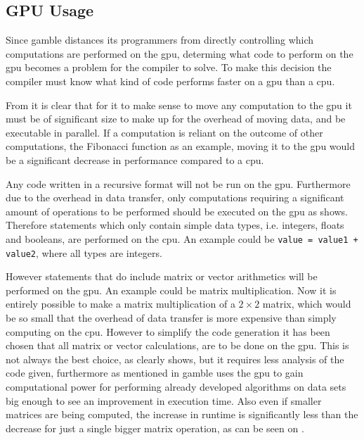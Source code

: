 \subsection*{GPU Usage}\label{GPUCode}
Since \gls{gamble} distances its programmers from directly controlling which computations are performed on the \acrshort{gpu}, determing what code to perform on the \acrshort{gpu} becomes a problem for the compiler to solve.
To make this decision the compiler must know what kind of code performs faster on a \acrshort{gpu} than a \acrshort{cpu}.

From  it is clear that for it to make sense to move any computation to the \acrshort{gpu} it must be of significant size to make up for the overhead of moving data, and be executable in parallel.
If a computation is reliant on the outcome of other computations, the Fibonacci function as an example, moving it to the \acrshort{gpu} would be a significant decrease in performance compared to a \acrshort{cpu}.

Any code written in a recursive format will not be run on the \acrshort{gpu}. 
Furthermore due to the overhead in data transfer, only computations requiring a significant amount of operations to be performed should be executed on the \acrshort{gpu} as  shows.
Therefore statements which only contain simple data types, i.e. integers, floats and booleans, are performed on the \acrshort{cpu}.
An example could be \texttt{value = value1 + value2}, where all types are integers.

However statements that do include matrix or vector arithmetics will be performed on the \acrshort{gpu}.
An example could be matrix multiplication.
Now it is entirely possible to make a matrix multiplication of a $2\times2$ matrix, which would be so small that the overhead of data transfer is more expensive than simply computing on the \acrshort{cpu}.
However to simplify the code generation it has been chosen that all matrix or vector calculations, are to be done on the \acrshort{gpu}.
This is not always the best choice, as  clearly shows, but it requires less analysis of the code given, furthermore as mentioned in  \gls{gamble} uses the \acrshort{gpu} to gain computational power for performing already developed algorithms on data sets big enough to see an improvement in execution time.
Also even if smaller matrices are being computed, the increase in runtime is significantly less than the decrease for just a single bigger matrix operation, as can be seen on .

